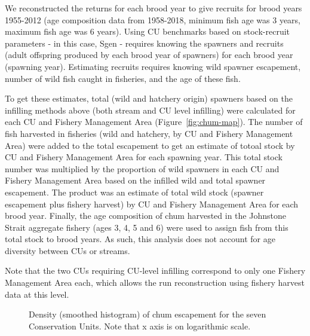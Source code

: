 \documentclass[11pt]{book}
\begin{document}
We reconstructed the returns for each brood year to give recruits for brood years 1955-2012 (age composition data from 1958-2018, minimum fish age was 3 years, maximum fish age was 6 years). Using CU benchmarks based on stock-recruit parameters - in this case, Sgen - requires knowing the spawners and recruits (adult offspring produced by each brood year of spawners) for each brood year (spawning year). Estimating recruits requires knowing wild spawner escapement, number of wild fish caught in fisheries, and the age of these fish.

To get these estimates, total (wild and hatchery origin) spawners based on the infilling methods above (both stream and CU level infilling) were calculated for each CU and Fishery Management Area (Figure~\ref{fig:chum-map}). The number of fish harvested in fisheries (wild and hatchery, by CU and Fishery Management Area) were added to the total escapement to get an estimate of totoal stock by CU and Fishery Management Area for each spawning year. This total stock number was multiplied by the proportion of wild spawners in each CU and Fishery Management Area based on the infilled wild and total spawner escapement. The product was an estimate of total wild stock (spawner escapement plus fishery harvest) by CU and Fishery Management Area for each brood year. Finally, the age composition of chum harvested in the Johnstone Strait aggregate fishery (ages 3, 4, 5 and 6) were used to assign fish from this total stock to brood years. As such, this analysis does not account for age diversity between CUs or streams.

Note that the two CUs requiring CU-level infilling correspond to only one Fishery Management Area each, which allows the run reconstruction using fishery harvest data at this level.
\begin{figure}[htb]

{\centering {} 

}

\caption{Density (smoothed histogram) of chum escapement for the seven Conservation Units. Note that x axis is on logarithmic scale.}\label{fig:chum-spawner-distribution}
\end{figure}
\end{document}
